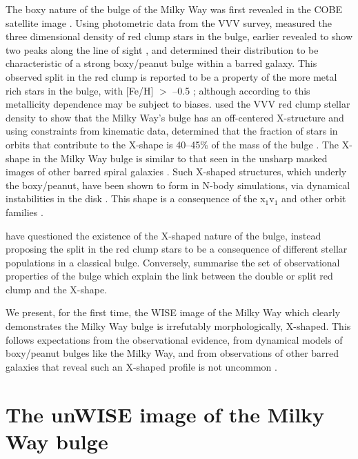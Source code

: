 \documentclass[12pt, preprint]{aastex}
\begin{document}
The boxy nature of the bulge of the Milky Way was first revealed in the COBE satellite image \citep{Dwek1995}. Using photometric data from the VVV survey, \citet{Wegg2013} measured the three dimensional density of red clump stars in the bulge, earlier revealed to show two peaks along the line of sight \citep{McWilliam2010, Nataf2010}, and determined their distribution to be characteristic of a strong boxy/peanut bulge within a barred galaxy. This observed split in the red clump is reported to be a property of the more metal rich stars in the bulge, with [Fe/H] $>$ --0.5 \citep{Ness2012, Uttenthaler2012}; although according to \citet{Nataf2014} this metallicity dependence may be subject to biases.  \citet{Portail2015b} used the VVV red clump stellar density to show that the Milky Way's bulge has an off-centered X-structure and using constraints from kinematic data, determined that the fraction of stars in orbits that contribute to the X-shape is 40--45\% of the mass of the bulge \citep{Portail2015a}. The X-shape in the Milky Way bulge is similar to that seen in the unsharp masked images of other barred spiral galaxies  \citep[e.g.][]{Bureau2006}. Such X-shaped structures, which underly the boxy/peanut, have been shown to form in N-body simulations, via dynamical instabilities in the disk \citep[e.g.][]{Athanassoula2005, Debattista2006, Inma2006}. This shape is a consequence of the x$_{1}$v$_{1}$ \citep{P1984, Athanassoula1992} and other orbit families \citep[e.g.][]{Portail2015b}. 

\citet{Lee2015} have questioned the existence of the X-shaped nature of the bulge, instead proposing the split in the red clump stars to be a consequence of different stellar populations in a classical bulge. Conversely,  \citet{Gonzalez2015} summarise the set of observational properties of the bulge which explain the link between the double or split red clump and the X-shape.


 We present, for the first time, the WISE image of the Milky Way \citep{Lang2014a} which clearly demonstrates the Milky Way bulge is irrefutably morphologically, X-shaped. This follows expectations from the observational evidence,  from dynamical models of boxy/peanut bulges like the Milky Way, and from observations of other barred galaxies that reveal such an X-shaped profile is not uncommon \citep{L2014}. 

\section{The unWISE image of the Milky Way bulge}
\end{document}
